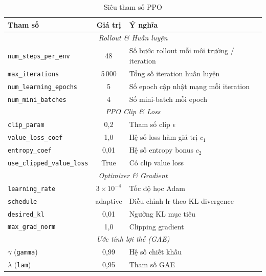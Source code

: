 \begin{table}[H]
    \centering
    \caption{Siêu tham số PPO}
    \label{tab:ppo_cfg}
    \renewcommand{\arraystretch}{1.3}
    \begin{tabular}{|l|c|l|}
    \hline
    \textbf{Tham số} & \textbf{Giá trị} & \textbf{Ý nghĩa} \\
    \hline
    \multicolumn{3}{|c|}{\textit{Rollout \& Huấn luyện}} \\
    \hline
    \texttt{num\_steps\_per\_env}  & 48      & Số bước rollout mỗi môi trường / iteration \\
    \texttt{max\_iterations}       & 5\,000  & Tổng số iteration huấn luyện \\
    \texttt{num\_learning\_epochs} & 5       & Số epoch cập nhật mạng mỗi iteration \\
    \texttt{num\_mini\_batches}    & 4       & Số mini-batch mỗi epoch \\
    \hline
    \multicolumn{3}{|c|}{\textit{PPO Clip \& Loss}} \\
    \hline
    \texttt{clip\_param}           & 0{,}2   & Tham số clip $\epsilon$ \\
    \texttt{value\_loss\_coef}     & 1{,}0   & Hệ số loss hàm giá trị $c_1$ \\
    \texttt{entropy\_coef}         & 0{,}01  & Hệ số entropy bonus $c_2$ \\
    \texttt{use\_clipped\_value\_loss} & True & Có clip value loss \\
    \hline
    \multicolumn{3}{|c|}{\textit{Optimizer \& Gradient}} \\
    \hline
    \texttt{learning\_rate}        & $3\times10^{-4}$ & Tốc độ học Adam \\
    \texttt{schedule}              & adaptive         & Điều chỉnh lr theo KL divergence \\
    \texttt{desired\_kl}           & 0{,}01           & Ngưỡng KL mục tiêu \\
    \texttt{max\_grad\_norm}       & 1{,}0            & Clipping gradient \\
    \hline
    \multicolumn{3}{|c|}{\textit{Ước tính lợi thế (GAE)}} \\
    \hline
    $\gamma$ (\texttt{gamma})      & 0{,}99  & Hệ số chiết khấu \\
    $\lambda$ (\texttt{lam})       & 0{,}95  & Tham số GAE \\
    \hline
    \end{tabular}
\end{table}

